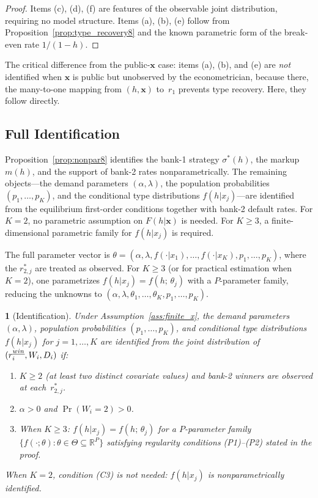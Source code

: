\documentclass[12pt]{article}
\theoremstyle{plain}
\theoremstyle{plain}
\newtheorem{prop}[thm]{\protect\propositionname}
\theoremstyle{definition}
\theoremstyle{remark}
\providecommand{\propositionname}{Proposition}
\begin{document}
\begin{proof}
Items (c), (d), (f) are features of the observable joint distribution, requiring no model structure.  Items (a), (b), (e) follow from Proposition~\ref{prop:type_recovery8} and the known parametric form of the break-even rate $1/(1-h)$.
\end{proof}

\medskip\noindent
The critical difference from the public-$\mathbf{x}$ case: items (a), (b), and (e) are \emph{not} identified when $\mathbf{x}$ is public but unobserved by the econometrician, because there, the many-to-one mapping from $(h, \mathbf{x})$ to~$r_1$ prevents type recovery.  Here, they follow directly.


\subsection{Full Identification}\label{sec:parametric8}

Proposition~\ref{prop:nonpar8} identifies the bank-1 strategy $\sigma^*(h)$, the markup $m(h)$, and the support of bank-2 rates nonparametrically.  The remaining objects---the demand parameters $(\alpha, \lambda)$, the population probabilities $(p_1, \ldots, p_K)$, and the conditional type distributions $f(h|x_j)$---are identified from the equilibrium first-order conditions together with bank-2 default rates.  For $K = 2$, no parametric assumption on $F(h|\mathbf{x})$ is needed.  For $K \geq 3$, a finite-dimensional parametric family for $f(h|x_j)$ is required.

The full parameter vector is $\theta = (\alpha, \lambda, f(\cdot|x_1), \ldots, f(\cdot|x_K), p_1, \ldots, p_K)$, where the $r_{2,j}^*$ are treated as observed.  For $K \geq 3$ (or for practical estimation when $K = 2$), one parametrizes $f(h|x_j) = f(h;\, \theta_j)$ with a $P$-parameter family, reducing the unknowns to $(\alpha, \lambda, \theta_1, \ldots, \theta_K, p_1, \ldots, p_K)$.

\begin{prop}[Identification]\label{prop:parametric_id8}
Under Assumption~\ref{ass:finite_x}, the demand parameters $(\alpha, \lambda)$, population probabilities $(p_1, \ldots, p_K)$, and conditional type distributions $f(h|x_j)$ for $j = 1, \ldots, K$ are identified from the joint distribution of $(r_i^{\emph{win}}, W_i, D_i)$ if:
\begin{enumerate}
    \item[(C1)] $K \geq 2$ (at least two distinct covariate values) and bank-2 winners are observed at each~$r_{2,j}^*$.
    \item[(C2)] $\alpha > 0$ and $\Pr(W_i = 2) > 0$.
    \item[(C3)] When $K \geq 3$: $f(h|x_j) = f(h;\,\theta_j)$ for a $P$-parameter family $\{f(\cdot;\theta) : \theta \in \Theta \subseteq \mathbb{R}^P\}$ satisfying regularity conditions (P1)--(P2) stated in the proof.
\end{enumerate}
When $K = 2$, condition (C3) is not needed: $f(h|x_j)$ is nonparametrically identified.
\end{prop}
\end{document}
